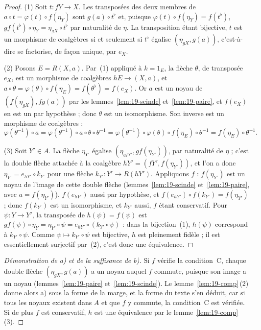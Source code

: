 \begin{proof}
(1) Soit $t : fY \to X$. Les transposées des deux membres de $a \circ t = \varphi(t) \circ f(\eta_Y)$ sont $g(a) \circ t^\flat$ et, puisque $\varphi(t) \circ f(\eta_Y) = f(t^\flat)$, $gf(t^\flat) \circ \eta_Y = \eta_{gX} \circ t^\flat$ par naturalité de $\eta$. La transposition étant bijective, $t$ est un morphisme de coalgèbres si et seulement si $t^\flat$ égalise $(\eta_{gX}, g(a))$, c'est-à-dire se factorise, de façon unique, par $e_X$.

(2) Posons $E = R(X, a)$. Par~(1) appliqué à $k = 1_E$, la flèche $\theta$, de transposée $e_X$, est un morphisme de coalgèbres $hE \to (X, a)$, et $a \circ \theta = \varphi(\theta) \circ f(\eta_E) = f(\theta^\flat) = f(e_X)$. Or $a$ est un noyau de $(f(\eta_{gX}), fg(a))$ par les lemmes~\ref{lem:19-scinde} et~\ref{lem:19-paire}, et $f(e_X)$ en est un par hypothèse ; donc $\theta$ est un isomorphisme. Son inverse est un morphisme de coalgèbres :
\[
\varphi(\theta^{-1}) \circ a = \varphi(\theta^{-1}) \circ a \circ \theta \circ \theta^{-1} = \varphi(\theta^{-1}) \circ \varphi(\theta) \circ f(\eta_E) \circ \theta^{-1} = f(\eta_E) \circ \theta^{-1}.
\]

(3) Soit $Y' \in A$. La flèche $\eta_{Y'}$ égalise $(\eta_{gfY'}, gf(\eta_{Y'}))$, par naturalité de $\eta$ ; c'est la double flèche attachée à la coalgèbre $hY' = (fY', f(\eta_{Y'}))$, et l'on a donc $\eta_{Y'} = e_{hY'} \circ k_{Y'}$ pour une flèche $k_{Y'} : Y' \to R(hY')$. Appliquons $f$ : $f(\eta_{Y'})$ est un noyau de l'image de cette double flèche (lemmes~\ref{lem:19-scinde} et~\ref{lem:19-paire}, avec $a = f(\eta_{Y'})$), $f(e_{hY'})$ aussi par hypothèse, et $f(e_{hY'}) \circ f(k_{Y'}) = f(\eta_{Y'})$ ; donc $f(k_{Y'})$ est un isomorphisme, et $k_{Y'}$ aussi, $f$ étant conservatif. Pour $\psi : Y \to Y'$, la transposée de $h(\psi) = f(\psi)$ est $gf(\psi) \circ \eta_Y = \eta_{Y'} \circ \psi = e_{hY'} \circ (k_{Y'} \circ \psi)$ : dans la bijection~(1), $h(\psi)$ correspond à $k_{Y'} \circ \psi$. Comme $\psi \mapsto k_{Y'} \circ \psi$ est bijective, $h$ est pleinement fidèle ; il est essentiellement surjectif par~(2), c'est donc une équivalence.
\end{proof}

\begin{proof}[Démonstration de a) et de la suffisance de b)]
Si $f$ vérifie la condition~C, chaque double flèche $(\eta_{gX}, g(a))$ a un noyau auquel $f$ commute, puisque son image a un noyau (lemmes~\ref{lem:19-paire} et~\ref{lem:19-scinde}). Le lemme~\ref{lem:19-comp}\,(2) donne alors a) sous la forme de la marge, et la forme du texte s'en déduit, car si tous les noyaux existent dans $A$ et que $f$ y commute, la condition~C est vérifiée. Si de plus $f$ est conservatif, $h$ est une équivalence par le lemme~\ref{lem:19-comp}\,(3).
\end{proof}

